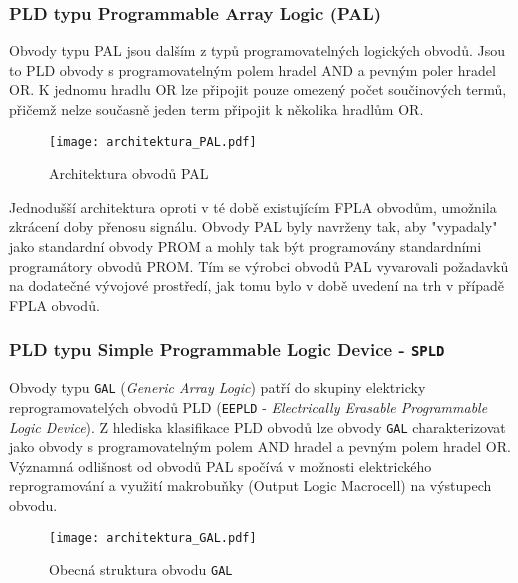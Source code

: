      \subsubsection{PLD typu Programmable Array Logic (PAL)}\label{PLO_kap_PAL}
        Obvody typu PAL jsou dalším z typů programovatelných logických obvodů. Jsou to PLD obvody s
        programovatelným polem hradel AND a pevným poler hradel OR. K jednomu hradlu OR lze
        připojit pouze omezený počet součinových termů, přičemž nelze současně jeden term připojit
        k několika hradlům OR.
      
        \begin{figure}[ht!]
          \centering
          \texttt{[image: architektura\_PAL.pdf]}
          \caption[Architektura obvodů PAL]{Architektura obvodů PAL}
          \label{PLO:fig_arch_PAL}
        \end{figure}
        
        Jednodušší architektura oproti v té době existujícím FPLA obvodům, umožnila zkrácení doby
        přenosu signálu. Obvody PAL byly navrženy tak, aby "vypadaly" jako standardní obvody PROM a
        mohly tak být programovány standardními programátory obvodů PROM. Tím se výrobci obvodů PAL
        vyvarovali požadavků na dodatečné vývojové prostředí, jak tomu bylo v době uvedení na trh v
        případě FPLA obvodů.
        
     \subsubsection{PLD typu Simple Programmable Logic Device - \texttt{SPLD}}\label{PLO_kap_GAL}
       Obvody typu \texttt{GAL} (\emph{Generic Array Logic}) patří do skupiny elektricky
       reprogramovatelých obvodů PLD (\texttt{EEPLD} - \emph{Electrically Erasable Programmable
       Logic Device}). Z hlediska klasifikace PLD obvodů lze obvody \texttt{GAL} charakterizovat
       jako obvody s programovatelným polem AND hradel a pevným polem hradel OR. Významná
       od\-liš\-nost od obvodů PAL spočívá v možnosti elektrického reprogramování a využití
       makro\-buň\-ky (Output Logic Macrocell) na výstupech obvodu.
       
        \begin{figure}[hb!]
          \centering
          \texttt{[image: architektura\_GAL.pdf]}
          \caption[Struktura obvodu GAL]{Obecná struktura obvodu \texttt{GAL}}
          \label{PLO:fig_arch_GAL}
        \end{figure}
               

